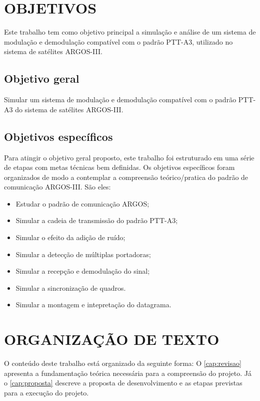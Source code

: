 \section{OBJETIVOS}\label{cap:objetivos}

Este trabalho tem como objetivo principal a simulação e análise de um sistema de modulação e demodulação compatível com o padrão \gls{PTT-A3}, utilizado no sistema de satélites \gls{ARGOS-III}. 

\subsection{Objetivo geral}

Simular um sistema de modulação e demodulação compatível com o padrão \gls{PTT-A3} do sistema de satélites \gls{ARGOS-III}.

\subsection{Objetivos específicos}

Para atingir o objetivo geral proposto, este trabalho foi estruturado em uma série de etapas com metas técnicas bem definidas. Os objetivos específicos foram organizados de modo a contemplar a compreensão teórico/pratica do padrão de comunicação \gls{ARGOS-III}. São eles:

\begin{itemize}
   \item Estudar o padrão de comunicação ARGOS; 
   \item Simular a cadeia de transmissão do padrão \gls{PTT-A3}; 
   \item Simular o efeito da adição de ruído;
   \item Simular a detecção de múltiplas portadoras;
   \item Simular a recepção e demodulação do sinal; 
   \item Simular a sincronização de quadros.
   \item Simular a montagem e intepretação do datagrama.
\end{itemize}


\section{ORGANIZAÇÃO DE TEXTO}

O conteúdo deste trabalho está organizado da seguinte forma: O  \autoref{cap:revisao} apresenta a fundamentação teórica necessária para a compreensão do projeto. Já o \autoref{cap:proposta} descreve a proposta de desenvolvimento e as etapas previstas para a execução do projeto.